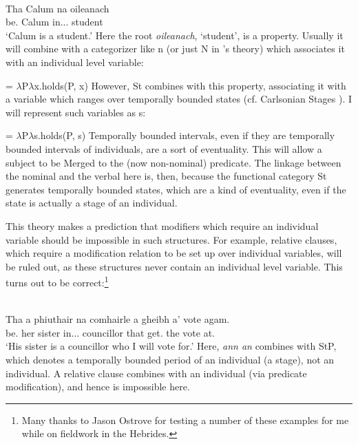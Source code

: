 \documentclass[output=paper]{langsci/langscibook}
\begin{document}
\ea {}\label{adger:ex:62}\\
 \gll  Tha Calum na oileanach\\
be.\Prs{} Calum in.\Poss.\Tsg.\M{} student\\
\glt \enquote*{Calum is a student.}
\z
Here the root \emph{oileanach}, `student', is a property. Usually it will
combine with a categorizer like n (or just N in \citeauthor{adgerbook}
\citeyear{adgerbook}'s theory) which
associates it with an individual level variable:

\ea {} = $\lambda$P$\lambda$x.holds(P, x) \z
However, St combines with this property, associating it with a variable which
ranges over temporally bounded states (cf. Carlsonian Stages
\citealt{carlson:77}). I will represent such variables as s:

\ea {} = $\lambda$P$\lambda$s.holds(P, s) \z
Temporally bounded intervals, even if they are temporally bounded intervals of
individuals,  are a sort of eventuality. This will allow a subject to be Merged to the (now non-nominal)
predicate. The linkage between the nominal and the verbal here is, then,
because the functional category St generates temporally bounded states, which
are a kind of eventuality, even if the state is actually a stage of an
individual.

This theory makes a prediction that modifiers which require an individual
variable should be impossible in such structures. For example, relative
clauses, which require a modification relation to be set up over individual
variables, will be ruled out, as these structures never contain an individual
level variable. This turns out to be correct:\footnote{Many thanks to Jason
Ostrove for testing a number of these examples for me while on fieldwork in the
Hebrides.}

\ea {}\\
    \gll * Tha a phiuthair na comhairle a gheibh a' vote agam. \\
        {} be.\Prs{} her sister in.\Poss.\Tsg.\glossF{} councillor that get.\Fut{} the vote at.\Fsg{}\\
    \glt {} \enquote*{His sister is a councillor who I will vote for.}
\z
Here, \emph{ann an} combines with StP, which denotes a temporally bounded
period of an individual (a stage), not an individual. A relative clause
combines with an individual (via predicate modification), and hence is
impossible here.
\end{document}
